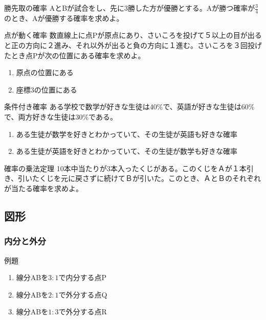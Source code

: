 \documentclass[10pt,dvipdfmx]{jsarticle}
\begin{document}
\begin{itembox}[l]{勝先取の確率}
  AとBが試合をし、先に3勝した方が優勝とする。Aが勝つ確率が$\frac{3}{4}$のとき、Aが優勝する確率を求めよ。
\end{itembox}

\begin{itembox}[l]{点が動く確率}
  数直線上に点Pが原点にあり、さいころを投げて５以上の目が出ると正の方向に２進み、それ以外が出ると負の方向に１進む。さいころを３回投げたとき点Pが次の位置にある確率を求めよ。
  \begin{enumerate}
    \item 原点の位置にある
    \item 座標3の位置にある
  \end{enumerate}
\end{itembox}
\begin{itembox}[l]{条件付き確率}
  ある学校で数学が好きな生徒は40\%で、英語が好きな生徒は60\%で、両方好きな生徒は30\%である。
  \begin{enumerate}
    \item ある生徒が数学を好きとわかっていて、その生徒が英語も好きな確率
    \item ある生徒が英語を好きとわかっていて、その生徒が数学も好きな確率
  \end{enumerate}
\end{itembox}

\begin{itembox}[l]{確率の乗法定理}
  10本中当たりが3本入ったくじがある。このくじをＡが１本引き、引いたくじを元に戻さずに続けてＢが引いた。このとき、ＡとＢのそれぞれが当たる確率を求めよ。
\end{itembox}

\newpage
\subsection*{図形}
\subsubsection*{内分と外分}
\begin{itembox}[l]{例題}
  \begin{enumerate}
    \item 線分ABを$3:1$で内分する点P
    \item 線分ABを$2:1$で外分する点Q
    \item 線分ABを$1:3$で外分する点R
  \end{enumerate}
\end{itembox}
\end{document}
